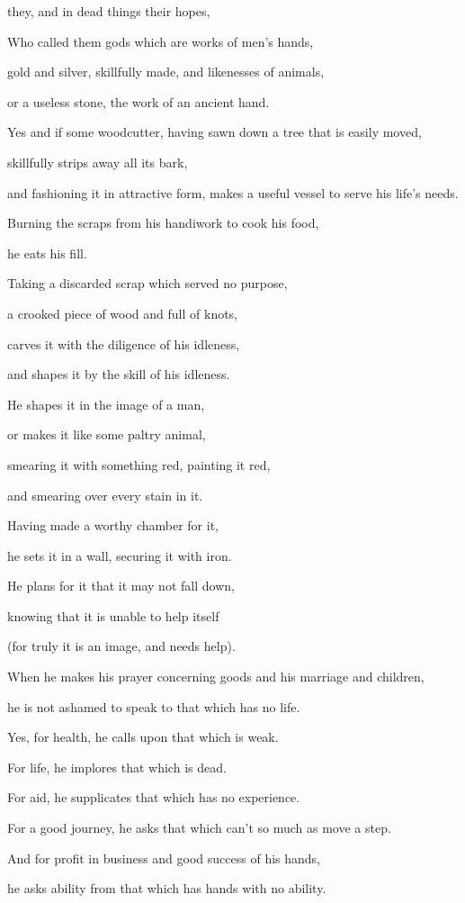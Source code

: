 {{{}} they, and
 in dead things
{} their hopes,
\par }{\QB Who called them gods which are works of men’s hands,
\par }{\QB gold and silver, skillfully made, and likenesses of animals,
\par }{\QB or a useless stone, the work of an ancient hand.
\par }{\Q {}Yes and if some
 woodcutter, having sawn down a
 tree that is easily moved,
\par }{\QB skillfully strips away all its bark,
\par }{\QB and fashioning it in attractive form, makes a useful vessel to serve his life’s needs.
\par }{\Q {}Burning the scraps from his handiwork to cook his food,
\par }{\QB he eats his fill.
\par }{\Q {}Taking a discarded scrap which served no purpose,
\par }{\QB a crooked piece of wood and full of knots,
\par }{\QB carves it with the diligence of his idleness,
\par }{\QB and shapes it by the skill of his
 idleness.
\par }{\Q He shapes it in the image of a man,
\par }{\QB {}or makes it like some paltry animal,
\par }{\QB smearing it with something red, painting it red,
\par }{\QB and smearing over every stain in it.
\par }{\Q {}Having made a worthy chamber for it,
\par }{\QB he sets it in a wall, securing it with iron.
\par }{\Q {}He plans for it that it may not fall down,
\par }{\QB knowing that it is unable to help itself
\par }{\QB (for truly it is an image, and needs help).
\par }{\Q {}When he makes his prayer concerning goods and his marriage and children,
\par }{\QB he is not ashamed to speak to that which has no life.
\par }{\Q {}Yes, for health, he calls upon that which is weak.
\par }{\QB For life, he implores that which is dead.
\par }{\QB For aid, he supplicates that which has no experience.
\par }{\QB For a good journey, he asks that which can’t so much as move a step.
\par }{\Q {}And for profit in business and good success of his hands,
\par }{\QB he asks ability from that which has hands with no ability.

}
